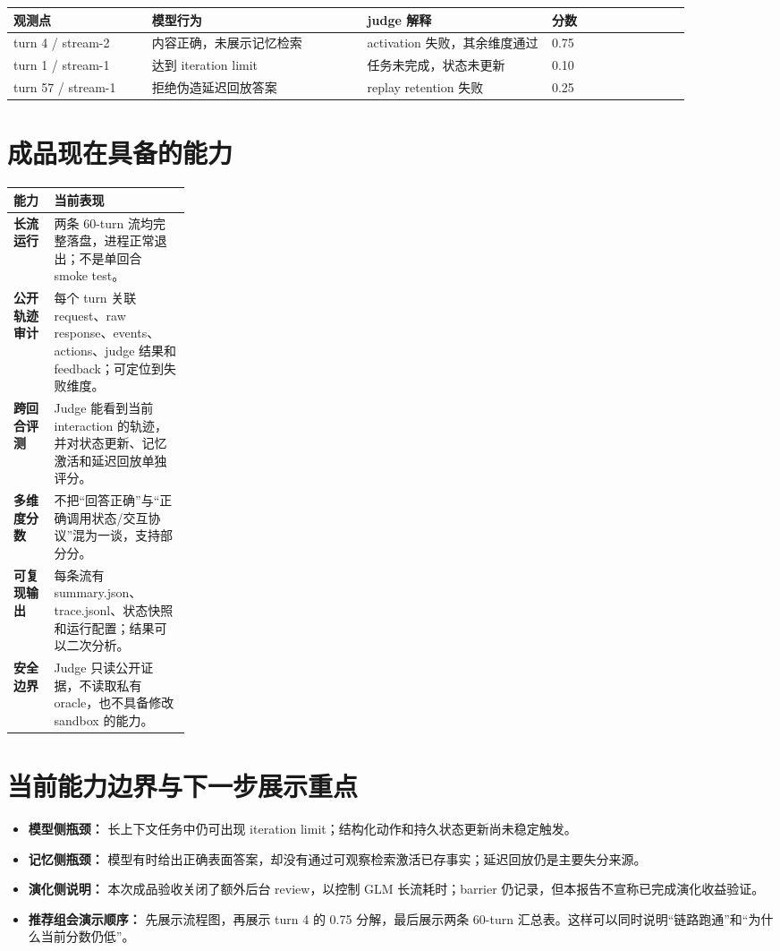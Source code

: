 \documentclass[11pt,a4paper]{article}
\begin{document}
\begin{center}
\renewcommand{\arraystretch}{1.25}
\begin{tabular}{p{0.18\linewidth}p{0.28\linewidth}p{0.24\linewidth}p{0.18\linewidth}}
\toprule
观测点 & 模型行为 & judge 解释 & 分数 \\
\midrule
turn 4 / stream-2 & 内容正确，未展示记忆检索 & activation 失败，其余维度通过 & 0.75 \\
turn 1 / stream-1 & 达到 iteration limit & 任务未完成，状态未更新 & 0.10 \\
turn 57 / stream-1 & 拒绝伪造延迟回放答案 & replay retention 失败 & 0.25 \\
\bottomrule
\end{tabular}
\end{center}

\section{成品现在具备的能力}

\begin{tabularx}{\linewidth}{>{\bfseries}p{0.23\linewidth}X}
\toprule
能力 & 当前表现 \\
\midrule
长流运行 & 两条 60-turn 流均完整落盘，进程正常退出；不是单回合 smoke test。 \\
公开轨迹审计 & 每个 turn 关联 request、raw response、events、actions、judge 结果和 feedback；可定位到失败维度。 \\
跨回合评测 & Judge 能看到当前 interaction 的轨迹，并对状态更新、记忆激活和延迟回放单独评分。 \\
多维度分数 & 不把“回答正确”与“正确调用状态/交互协议”混为一谈，支持部分分。 \\
可复现输出 & 每条流有 summary.json、trace.jsonl、状态快照和运行配置；结果可以二次分析。 \\
安全边界 & Judge 只读公开证据，不读取私有 oracle，也不具备修改 sandbox 的能力。 \\
\bottomrule
\end{tabularx}

\section{当前能力边界与下一步展示重点}

\begin{itemize}
\item \textbf{模型侧瓶颈：} 长上下文任务中仍可出现 iteration limit；结构化动作和持久状态更新尚未稳定触发。
\item \textbf{记忆侧瓶颈：} 模型有时给出正确表面答案，却没有通过可观察检索激活已存事实；延迟回放仍是主要失分来源。
\item \textbf{演化侧说明：} 本次成品验收关闭了额外后台 review，以控制 GLM 长流耗时；barrier 仍记录，但本报告不宣称已完成演化收益验证。
\item \textbf{推荐组会演示顺序：} 先展示流程图，再展示 turn 4 的 0.75 分解，最后展示两条 60-turn 汇总表。这样可以同时说明“链路跑通”和“为什么当前分数仍低”。
\end{itemize}
\end{document}
